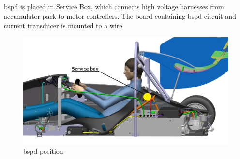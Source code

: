 \gls{bspd} is placed in Service Box, which connects high voltage harnesses from accumulator pack to motor controllers. The board containing \gls{bspd} circuit and current transducer is mounted to a wire.
\begin{figure}[H]
	\centering
	\includegraphics[width=\textwidth]{./img/ServiceBox-position.jpg}
	\caption{\gls{bspd} position}
	\label{fig:BSPD-position}
\end{figure}
